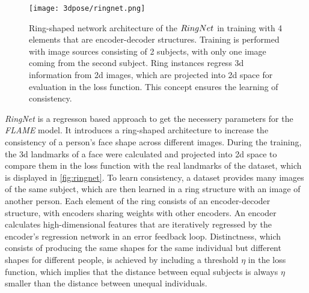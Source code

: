 \begin{figure}[h]
	\centering
	\texttt{[image: 3dpose/ringnet.png]}
	\caption{Ring-shaped network architecture of the $\protect RingNet$ in training with 4 elements that are encoder-decoder structures. Training is performed with image sources consisting of 2 subjects, with only one image coming from the second subject. Ring instances regress 3d information from 2d images, which are projected into 2d space for evaluation in the loss function. This concept ensures the learning of consistency.\cite{ringnet}}
	\label{fig:ringnet}
\end{figure}

\emph{RingNet} \cite{ringnet} is a regresson based approach to get the necessery parameters for the \emph{FLAME} model. It introduces a ring-shaped architecture to increase the consistency of a person's face shape across different images. During the training, the 3d landmarks of a face were calculated and projected into 2d space to compare them in the loss function with the real landmarks of the dataset, which is displayed in \autoref{fig:ringnet}. To learn consistency, a dataset provides many images of the same subject, which are then learned in a ring structure with an image of another person. Each element of the ring consists of an encoder-decoder structure, with encoders sharing weights with other encoders. An encoder calculates high-dimensional features that are iteratively regressed by the encoder's regression network in an error feedback loop. Distinctness, which consists of producing the same shapes for the same individual but different shapes for different people, is achieved by including a threshold $\eta$ in the loss function, which implies that the distance between equal subjects is always $\eta$ smaller than the distance between unequal individuals. \\

